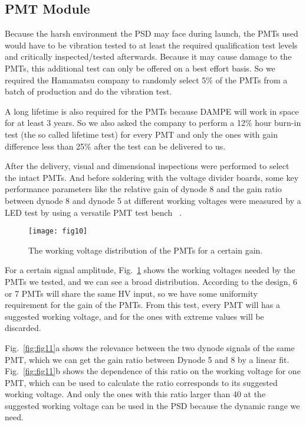 \documentclass[preprint]{elsarticle}
\begin{document}
\subsection{PMT Module}

Because the harsh environment the PSD may face during launch, the PMTs used would have to be vibration tested to at least the required qualification test levels and critically inspected/tested afterwards. Because it may cause damage to the PMTs, this additional test can only be offered on a best effort basis. So we required the Hamamatsu company to randomly select 5\% of the PMTs from a batch of production and do the vibration test.

A long lifetime is also required for the PMTs because DAMPE will work in space for at least 3 years. So we also asked the company to perform a 12\% hour burn-in test (the so called lifetime test) for every PMT and only the ones with gain difference less than 25\% after the test can be delivered to us.

After the delivery, visual and dimensional inspections were performed to select the intact PMTs. And before soldering with the voltage divider boards, some key performance parameters like the relative gain of dynode 8 and the gain ratio between dynode 8 and dynode 5 at different working voltages were measured by a LED test by using a versatile PMT test bench ~\cite{zhou2016}.

\begin{figure}
 \centering
 \texttt{[image: fig10]}
\caption{The working voltage distribution of the PMTs for a certain gain. }
\label{fig:fig10}
\end{figure}

For a certain signal amplitude, Fig.~\ref{fig:fig10} shows the working voltages needed by the PMTs we tested, and we can see a broad distribution. According to the design, 6 or 7 PMTs will share the same HV input, so we have some uniformity requirement for the gain of the PMTs. From this test, every PMT will has a suggested working voltage, and for the ones with extreme values will be discarded.

Fig.~\ref{fig:fig11}a shows the relevance between the two dynode signals of the same PMT, which we can get the gain ratio between Dynode 5 and 8 by a linear fit. Fig.~\ref{fig:fig11}b shows the dependence of this ratio on the working voltage for one PMT, which can be used to calculate the ratio corresponds to its suggested working voltage. And only the ones with this ratio larger than 40 at the suggested working voltage can be used in the PSD because the dynamic range we need.
\end{document}
